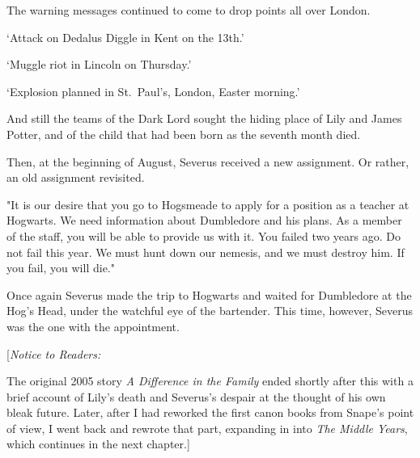 The warning messages continued to come to drop points all over London.

`Attack on Dedalus Diggle in Kent on the 13th.'

`Muggle riot in Lincoln on Thursday.'

`Explosion planned in St.~Paul's, London, Easter morning.'

And still the teams of the Dark Lord sought the hiding place of Lily and James Potter, and of the child that had been born as the seventh month died.

Then, at the beginning of August, Severus received a new assignment. Or rather, an old assignment revisited.

"It is our desire that you go to Hogsmeade to apply for a position as a teacher at Hogwarts. We need information about Dumbledore and his plans. As a member of the staff, you will be able to provide us with it. You failed two years ago. Do not fail this year. We must hunt down our nemesis, and we must destroy him. If you fail, you will die."

Once again Severus made the trip to Hogwarts and waited for Dumbledore at the Hog's Head, under the watchful eye of the bartender. This time, however, Severus was the one with the appointment.

[\emph{Notice to Readers:}

The original 2005 story \emph{A Difference in the Family }ended shortly after this with a brief account of Lily's death and Severus's despair at the thought of his own bleak future. Later, after I had reworked the first canon books from Snape's point of view, I went back and rewrote that part, expanding in into \emph{The Middle Years}, which continues in the next chapter.]


